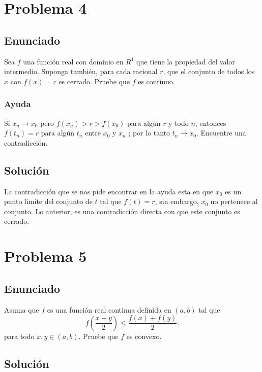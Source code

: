 \documentclass{report}
\begin{document}
\chapter{Problema 4}
\section{Enunciado}


Sea $f$ una función real con dominio en $R^{1}$ que tiene la propiedad del valor intermedio. Suponga también, para cada racional $r$, que el conjunto de todos los $x$ con $f(x)=r$ es cerrado. Pruebe que $f$ es continuo.

\subsection{Ayuda}
Si $x_n \to x_0$ pero $f\left( x_n \right) > r > f\left( x_0 \right) $ para algún $r$ y todo $n$, entonces  $f\left( t_n \right) = r$ para algún $t_n$ entre $x_0$ y $x_n$ ; por lo tanto $t_n \to  x_0$. Encuentre una contradicción.

\section{Solución}

La contradicción que se nos pide encontrar en la ayuda esta en que $x_0$ es un punto limite del conjunto de $t$ tal que $f\left( t \right) = r$, sin embargo, $x_0$ no pertenece al conjunto. Lo anterior, es una contradicción directa con que este conjunto es cerrado.

\chapter{Problema 5}
\section{Enunciado}

Asuma que $f$ es una función real continua definida en $\left( a, b \right) $ tal que \[
f\left( \frac{x + y}{2} \right) \le \frac{f(x) + f(y)}{2}
.\] para todo $x, y \in \left( a,b \right) $. Pruebe que $f$ es convexo.

\section{Solución}
\end{document}
